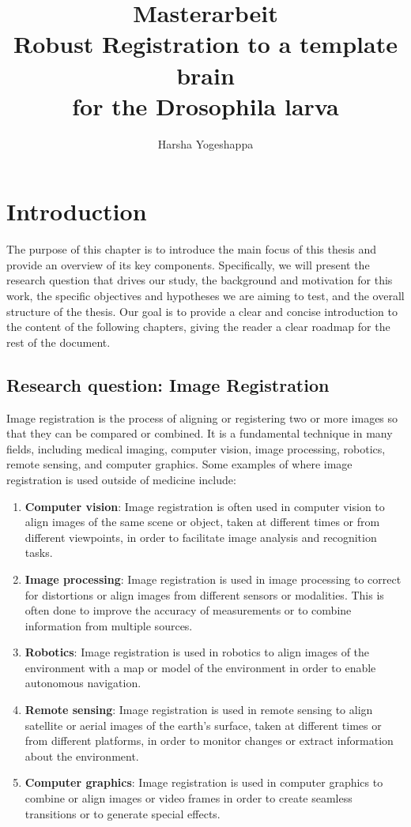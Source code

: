\documentclass{report}
\title{
	Masterarbeit \\
	Robust Registration to a template brain  \\
	for the Drosophila larva \large }
\author{Harsha Yogeshappa}
\begin{document}
	\maketitle
	\newpage
	
	\hypersetup{linkcolor=rwth-blue-1}
	\tableofcontents
	\newpage
	
	\chapter{Introduction}
	The purpose of this chapter is to introduce the main focus of this thesis and provide an overview of its key components. Specifically, we will present the research question that drives our study, the background and motivation for this work, the specific objectives and hypotheses we are aiming to test, and the overall structure of the thesis. Our goal is to provide a clear and concise introduction to the content of the following chapters, giving the reader a clear roadmap for the rest of the document.
	
	\section{Research question: Image Registration}
	Image registration is the process of aligning or registering two or more images so that they can be compared or combined. It is a fundamental technique in many fields, including medical imaging, computer vision, image processing, robotics, remote sensing, and computer graphics. Some examples of where image registration is used outside of medicine include:
	\begin{enumerate}
		\item \textbf{Computer vision}: Image registration is often used in computer vision to align images of the same scene or object, taken at different times or from different viewpoints, in order to facilitate image analysis and recognition tasks.
		\item \textbf{Image processing}: Image registration is used in image processing to correct for distortions or align images from different sensors or modalities. This is often done to improve the accuracy of measurements or to combine information from multiple sources.
		\item \textbf{Robotics}: Image registration is used in robotics to align images of the environment with a map or model of the environment in order to enable autonomous navigation.
		\item \textbf{Remote sensing}: Image registration is used in remote sensing to align satellite or aerial images of the earth's surface, taken at different times or from different platforms, in order to monitor changes or extract information about the environment.
		\item \textbf{Computer graphics}: Image registration is used in computer graphics to combine or align images or video frames in order to create seamless transitions or to generate special effects.
	\end{enumerate}
	
\end{document}
